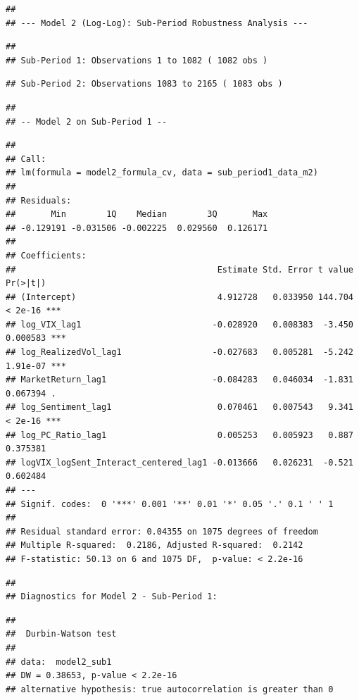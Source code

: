 \documentclass[
]{article}
\begin{document}
\begin{verbatim}
## 
## --- Model 2 (Log-Log): Sub-Period Robustness Analysis ---
\end{verbatim}

\begin{verbatim}
## 
## Sub-Period 1: Observations 1 to 1082 ( 1082 obs )
\end{verbatim}

\begin{verbatim}
## Sub-Period 2: Observations 1083 to 2165 ( 1083 obs )
\end{verbatim}

\begin{verbatim}
## 
## -- Model 2 on Sub-Period 1 --
\end{verbatim}

\begin{verbatim}
## 
## Call:
## lm(formula = model2_formula_cv, data = sub_period1_data_m2)
## 
## Residuals:
##       Min        1Q    Median        3Q       Max 
## -0.129191 -0.031506 -0.002225  0.029560  0.126171 
## 
## Coefficients:
##                                        Estimate Std. Error t value Pr(>|t|)    
## (Intercept)                            4.912728   0.033950 144.704  < 2e-16 ***
## log_VIX_lag1                          -0.028920   0.008383  -3.450 0.000583 ***
## log_RealizedVol_lag1                  -0.027683   0.005281  -5.242 1.91e-07 ***
## MarketReturn_lag1                     -0.084283   0.046034  -1.831 0.067394 .  
## log_Sentiment_lag1                     0.070461   0.007543   9.341  < 2e-16 ***
## log_PC_Ratio_lag1                      0.005253   0.005923   0.887 0.375381    
## logVIX_logSent_Interact_centered_lag1 -0.013666   0.026231  -0.521 0.602484    
## ---
## Signif. codes:  0 '***' 0.001 '**' 0.01 '*' 0.05 '.' 0.1 ' ' 1
## 
## Residual standard error: 0.04355 on 1075 degrees of freedom
## Multiple R-squared:  0.2186, Adjusted R-squared:  0.2142 
## F-statistic: 50.13 on 6 and 1075 DF,  p-value: < 2.2e-16
\end{verbatim}

\begin{verbatim}
## 
## Diagnostics for Model 2 - Sub-Period 1:
\end{verbatim}

\begin{verbatim}
## 
##  Durbin-Watson test
## 
## data:  model2_sub1
## DW = 0.38653, p-value < 2.2e-16
## alternative hypothesis: true autocorrelation is greater than 0
\end{verbatim}
\end{document}
